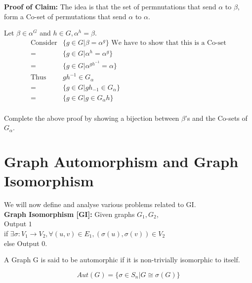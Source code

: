 \textbf{Proof of Claim:}
The idea is that the set of permnutations that send $\alpha$ to $\beta$, form a Co-set of permutations that send $\alpha$ to $\alpha$.

Let $\beta \in \alpha^G$ and $h \in G,\alpha^h = \beta$.
\begin{align*}
\text{Consider} & \{g \in G| \beta = \alpha^g\}
\text{  We have to show that this is a Co-set}\\
 = & \{ g \in G | \alpha^h = \alpha^g \}\\
 = & \{ g \in G | \alpha^{gh^{-1}} = \alpha\}\\
\text{Thus } &  gh^{-1} \in G_{\alpha}\\
 = & \{ g \in G | gh_{-1} \in G_{\alpha} \}\\
 = & \{ g \in G | g \in G_{\alpha}h \}\\
\end{align*}

\begin{exercise}
 Complete the above proof by showing a bijection between $\beta$'s and the Co-sets of $G_{\alpha}$.
\end{exercise}

\section{Graph Automorphism and Graph Isomorphism}
We will now define and analyse various problems related to GI.\\
\textbf{Graph Isomorphism [GI]: } Given graphs $G_1, G_2$,\\
Output  $1$ \\ if $\exists \sigma : V_1 \rightarrow V_2, \forall (u,v) \in E_1, (\sigma(u),\sigma(v)) \in V_2$\\
 else Output  $0$.

\begin{definition}[Automorphism]
A Graph G is said to be automorphic if it is non-trivially isomorphic to itself.
\end{definition}

\begin{definition}[$Aut(G)$]
\[Aut(G) = \{\sigma \in S_n | G \cong \sigma(G)\}\]
\end{definition}


